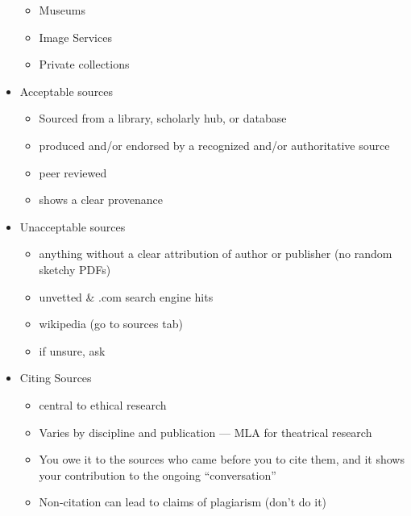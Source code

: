 \documentclass[12pt]{article}
\begin{document}
\begin{itemize}
\begin{itemize}
                    \item Museums
                    \item Image Services
                    \item Private collections
                \end{itemize}
                \item Acceptable sources
                \begin{itemize}
                    \item Sourced from a library, scholarly hub, or database
                    \item produced and/or endorsed by a recognized and/or authoritative source
                    \item peer reviewed
                    \item shows a clear provenance
                \end{itemize}
                \item Unacceptable sources
                \begin{itemize}
                    \item anything without a clear attribution of author or publisher (no random sketchy PDFs)
                    \item unvetted \& .com search engine hits
                    \item wikipedia (go to sources tab)
                    \item if unsure, ask
                \end{itemize}
                \item Citing Sources
                \begin{itemize}
                    \item central to ethical research
                    \item Varies by discipline and publication --- MLA for theatrical research
                    \item You owe it to the sources who came before you to cite them, and it shows your contribution to the ongoing ``conversation''
                    \item Non-citation can lead to claims of plagiarism (don't do it)
                \end{itemize}
            \end{itemize}
               
\end{document}

